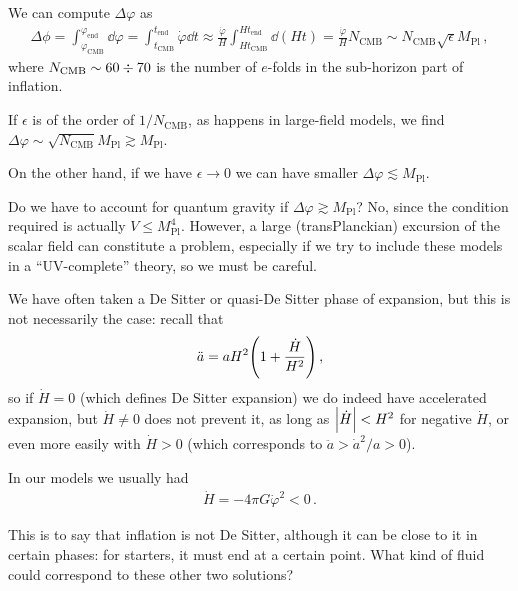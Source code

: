 \documentclass[main.tex]{subfiles}
\begin{document}
We can compute \(\Delta \varphi \) as 
%
\begin{align}
\Delta  \phi = \int_{\varphi _{\text{CMB}}}^{\varphi _{\text{end}}} \dd{\varphi } = \int_{t _{\text{CMB}}}^{t _{\text{end}}} \dot{\varphi} \dd{t} \approx \frac{\dot{\varphi}}{H} \int_{H t _{\text{CMB}}}^{H t _{\text{end}}} \dd{(Ht)} = \frac{\dot{\varphi}}{H} 
N _{\text{CMB}} \sim N _{\text{CMB}} \sqrt{\epsilon } M _{\text{Pl}}
\,,
\end{align}
%
where \(N _{\text{CMB}} \sim 60 \divisionsymbol 70\) is the number of \(e\)-folds in the sub-horizon part of inflation. 

If \(\epsilon \) is of the order of \(1 / N _{\text{CMB}}\), as happens in large-field models, we find \(\Delta \varphi \sim \sqrt{N _{\text{CMB}}} M _{\text{Pl}} \gtrsim M _{\text{Pl}}\).



On the other hand, if we have \(\epsilon \to 0\) we can have smaller \(\Delta \varphi \lesssim M _{\text{Pl}}\). 

Do we have to account for quantum gravity if \(\Delta \varphi \gtrsim M _{\text{Pl}}\)? No, since the condition required is actually \(V \leq M _{\text{Pl}}^{4}\).
However, a large (transPlanckian) excursion of the scalar field can constitute a problem, especially if we try to include these models in a ``UV-complete'' theory, so we must be careful.

We have often taken a De Sitter or quasi-De Sitter phase of expansion, but this is not necessarily the case: recall that 
%
\begin{align}
\ddot{a} = a H^2 \qty(1 + \frac{\dot{H}}{H^2})
\,,
\end{align}
%
so if \(\dot{H} = 0\) (which defines De Sitter expansion) we do indeed have accelerated expansion, but \(\dot{H} \neq 0 \) does not prevent it, as long as \(\abs{\dot{H}} < H^2\) for negative \(\dot{H}\), or even more easily with \(\dot{H} > 0\) (which corresponds to \(\ddot{a} > \dot{a}^2 / a  > 0\)). 

In our models we usually had 
%
\begin{align} \label{eq:derivative-Hubble-parameter-scalar-field}
\dot{H} = - 4 \pi G \dot{\varphi}^2 < 0
\,.
\end{align}

This is to say that inflation is not De Sitter, although it can be close to it in certain phases: for starters, it must end at a certain point. 
What kind of fluid could correspond to these other two solutions? 
\end{document}
